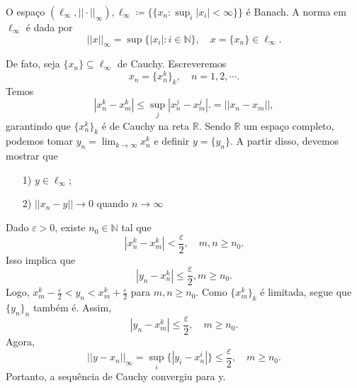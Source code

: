 \documentclass[MetricSpaces/metric_notes.tex]{subfiles}
\begin{document}
\begin{example}
	O espaço \((\ell_{\infty}, ||\cdot ||_{\infty}), \ell_{\infty}\coloneqq \biggl\{\{x_{n}:\sup_{i}|x_{i}|<\infty\}\biggr\}\) é Banach. A norma em \(\ell_{\infty}\) é dada por
	\[
		||x||_{\infty}=\sup\{|x_{i}|:i\in \mathbb{N}\},\quad x = \{x_{n}\}\in \ell_{\infty}.
	\]

	De fato, seja \(\{x_{n}\}\subseteq{\ell_{\infty}}\) de Cauchy. Escreveremos
	\[
		x_{n} = \{x_{n}^{k}\}_{k}, \quad n = 1, 2, \cdots.
	\]
	Temos
	\[
		|x_{n}^{k}-x_{m}^{k}|\leq \sup_{j}|x_{n}^{j}-x_{m}^{j} |. = ||x_{n}-x_{m}||,
	\]
	garantindo que \(\{x_{n}^{k}\}_{k}\) é de Cauchy na reta \(\mathbb{R}\). Sendo \(\mathbb{R}\) um espaço completo, podemos tomar
	\(y_{n} = \lim_{k\to \infty}x_{n}^{k}\) e definir \(y = \{y_{n}\}\). A partir disso, devemos mostrar que
	\begin{itemize}
		\item[1)] \(y\in \ell_{\infty}\);
		\item[2)] \(||x_{n}-y||\longrightarrow 0\) quando \(n\longrightarrow\infty\)
	\end{itemize}
	Dado \(\varepsilon > 0\), existe \(n_{0}\in \mathbb{N}\) tal que
	\[
		|x_{n}^{k}-x_{m}^{k}| < \frac{\varepsilon }{2},\quad m,n\geq n_{0}.
	\]
	Isso implica que
	\[
		|y_{n}-x_{n}^{k}|\leq \frac{\varepsilon }{2}, m\geq n_{0}.
	\]
	Logo, \(x_{m}^{k}-\frac{\varepsilon }{2} < y_{n} < x_{m}^{k}+\frac{\varepsilon }{2}\) para \(m, n\geq n_{0}.\) Como
	\(\{x_{m}^{k}\}_{k}\) é limitada, segue que \(\{y_{n}\}_{n}\) também é. Assim,
	\[
		|y_{n}-x_{m}^{k}|\leq \frac{\varepsilon }{2},\quad m\geq n_{0}.
	\]
	Agora,
	\[
		||y-x_{n}||_{\infty}=\sup_{i}\{|y_{i}-x_{n}^{i}|\}\leq \frac{\varepsilon }{2},\quad m\geq n_{0}.
	\]
	Portanto, a sequência de Cauchy convergiu para y.
\end{example}
\end{document}
